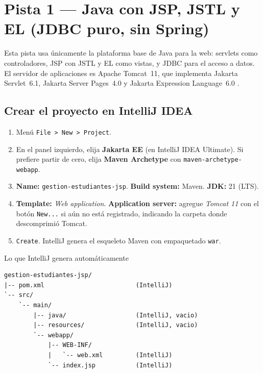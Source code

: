 \documentclass[11pt,a4paper,openany]{book}
\begin{document}
\section{Pista 1 --- Java con JSP, JSTL y EL (JDBC puro, sin Spring)}
\label{ap:crud:jsp}

Esta pista usa únicamente la plataforma base de Java para la web:
servlets como controladores, JSP con JSTL y EL como vistas, y JDBC para
el acceso a datos. El servidor de aplicaciones es Apache Tomcat~11, que
implementa Jakarta Servlet~6.1, Jakarta Server Pages~4.0 y Jakarta
Expression Language~6.0 \cite{pgjdbc}.

\subsection{Crear el proyecto en IntelliJ IDEA}
\label{ap:crud:jsp:crear}

\begin{enumerate}
\item Menú \texttt{File > New > Project}.
\item En el panel izquierdo, elija \textbf{Jakarta EE} (en IntelliJ
IDEA Ultimate). Si prefiere partir de cero, elija \textbf{Maven
Archetype} con \texttt{maven-archetype-webapp}.
\item \textbf{Name:} \texttt{gestion-estudiantes-jsp}. \textbf{Build
system:} Maven. \textbf{JDK:} 21 (LTS).
\item \textbf{Template:} \emph{Web application}. \textbf{Application
server:} agregue \emph{Tomcat 11} con el botón \texttt{New...} si aún
no está registrado, indicando la carpeta donde descomprimió Tomcat.
\item \texttt{Create}. IntelliJ genera el esqueleto Maven con
empaquetado \texttt{war}.
\end{enumerate}

\begin{cajaejemplo}{Lo que IntelliJ genera automáticamente}
\begin{lstlisting}[style=shell,caption={Esqueleto inicial creado por IntelliJ IDEA},label={lst:jsp-skel}]
gestion-estudiantes-jsp/
|-- pom.xml                         (IntelliJ)
`-- src/
    `-- main/
        |-- java/                   (IntelliJ, vacio)
        |-- resources/              (IntelliJ, vacio)
        `-- webapp/
            |-- WEB-INF/
            |   `-- web.xml         (IntelliJ)
            `-- index.jsp           (IntelliJ)
\end{lstlisting}
\end{cajaejemplo}
\end{document}
